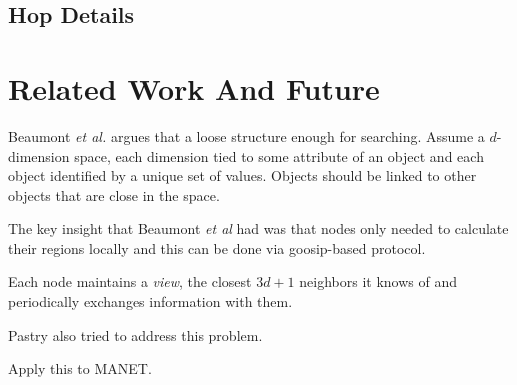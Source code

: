 \documentclass{IEEEtran}
\begin{document}

\subsection{Hop Details}


\section{Related Work And Future}



Beaumont \textit{et al.} \cite{raynet}  argues that a loose structure enough for searching.  Assume a $d$-dimension space, each dimension tied to some attribute of an object and each object identified by a unique set of values.  Objects should be linked to other objects that are close in the space.
 

The key insight that Beaumont \textit{et al} had  was that nodes only needed to calculate their regions locally and this can be done via goosip-based protocol.

Each node maintains a \textit{view}, the closest $3d+1$ neighbors it knows of and periodically exchanges information with them.


Pastry also tried to address this problem.


Apply this to MANET.




\end{document}
